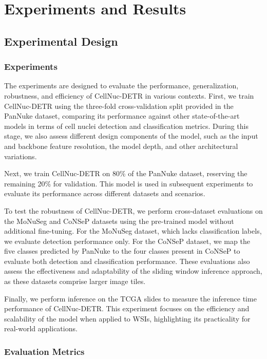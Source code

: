 \section{Experiments and Results}
\label{sec:results}

\subsection{Experimental Design}
\label{sec:results:design}

\subsubsection{Experiments}
\label{sec:results:design:experiments}

The experiments are designed to evaluate the performance, generalization, robustness, and efficiency of CellNuc-DETR in various contexts. First, we train CellNuc-DETR using the three-fold cross-validation split provided in the PanNuke dataset, comparing its performance against other state-of-the-art models in terms of cell nuclei detection and classification metrics. During this stage, we also assess different design components of the model, such as the input and backbone feature resolution, the model depth, and other architectural variations. 

Next, we train CellNuc-DETR on 80\% of the PanNuke dataset, reserving the remaining 20\% for validation. This model is used in subsequent experiments to evaluate its performance across different datasets and scenarios.

To test the robustness of CellNuc-DETR, we perform cross-dataset evaluations on the MoNuSeg and CoNSeP datasets using the pre-trained model without additional fine-tuning. For the MoNuSeg dataset, which lacks classification labels, we evaluate detection performance only. For the CoNSeP dataset, we map the five classes predicted by PanNuke to the four classes present in CoNSeP to evaluate both detection and classification performance. These evaluations also assess the effectiveness and adaptability of the sliding window inference approach, as these datasets comprise larger image tiles.

Finally, we perform inference on the TCGA slides to measure the inference time performance of CellNuc-DETR. This experiment focuses on the efficiency and scalability of the model when applied to WSIs, highlighting its practicality for real-world applications.

\subsubsection{Evaluation Metrics}
\label{sec:results:design:metrics}

